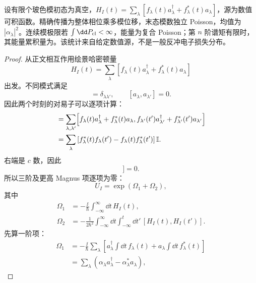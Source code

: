 \begin{theorem}
设有限个玻色模初态为真空，$H_I(t)=\sum_\lambda[f_\lambda(t)a_\lambda^\dagger+f_\lambda^*(t)a_\lambda]$，源为数值可积函数。精确传播为整体相位乘多模位移，末态模数独立 Poisson，均值为 $|\alpha_\lambda|^2$。连续模极限若 $\int\dd P_{\rm cl}<\infty$，能量为复合 Poisson；第 $n$ 阶谱矩有限时，其能量累积量为。该统计来自给定数值源，不是一般反冲电子损失分布。
\end{theorem}
\begin{proof}
从正文相互作用绘景哈密顿量
\begin{equation*}
 H_I(t)
 =\sum_\lambda
 \left[f_\lambda(t)a_\lambda^\dagger
 +f_\lambda^*(t)a_\lambda\right]
\end{equation*}
出发。不同模式满足
\begin{equation*}
 [a_\lambda,a_{\lambda'}^\dagger]=\delta_{\lambda\lambda'},
 \qquad
 [a_\lambda,a_{\lambda'}]=0.
\end{equation*}
因此两个时刻的对易子可以逐项计算：
\begin{align*}
 [H_I(t),H_I(t')]
 &=\sum_{\lambda,\lambda'}
 \Bigl[
 f_\lambda(t)a_\lambda^\dagger+f_\lambda^*(t)a_\lambda,
 f_{\lambda'}(t')a_{\lambda'}^\dagger+f_{\lambda'}^*(t')a_{\lambda'}
 \Bigr]\\
 &=\sum_\lambda
 \left[
 f_\lambda^*(t)f_\lambda(t')
 -f_\lambda(t)f_\lambda^*(t')
 \right]\mathbb I.
\end{align*}
右端是 $c$ 数，因此
\begin{equation*}
 [H_I(t_1),[H_I(t_2),H_I(t_3)]]=0.
\end{equation*}
所以三阶及更高 Magnus 项逐项为零：
\begin{equation*}
 U_I=\exp(\Omega_1+\Omega_2),
\end{equation*}
其中
\begin{align*}
 \Omega_1
 &=-\frac{\ii}{\hbar}
 \int_{-\infty}^{\infty}\dd t\,H_I(t),\\
 \Omega_2
 &=-\frac1{2\hbar^2}
 \int_{-\infty}^{\infty}\dd t
 \int_{-\infty}^{t}\dd t'\,
 [H_I(t),H_I(t')].
\end{align*}
先算一阶项：
\begin{align*}
 \Omega_1
 &=-\frac{\ii}{\hbar}
 \sum_\lambda
 \left[
 a_\lambda^\dagger\int\dd t\,f_\lambda(t)
 +a_\lambda\int\dd t\,f_\lambda^*(t)
 \right]\\
 &=\sum_\lambda
 \left(\alpha_\lambda a_\lambda^\dagger
 -\alpha_\lambda^*a_\lambda\right),
\end{align*}

\end{proof}
